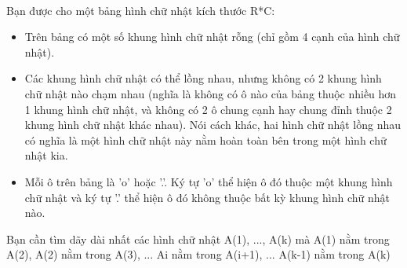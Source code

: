  

Bạn được cho một bảng hình chữ nhật kích thước R*C:
\begin{itemize}
	\item Trên bảng có một số khung hình chữ nhật rỗng (chỉ gồm 4 cạnh của hình chữ nhật).
	\item Các khung hình chữ nhật có thể lồng nhau, nhưng không có 2 khung hình chữ nhật nào chạm nhau (nghĩa là không có ô nào của bảng thuộc nhiều hơn 1 khung hình chữ nhật, và không có 2 ô chung cạnh hay chung đỉnh thuộc 2 khung hình chữ nhật khác nhau). Nói cách khác, hai hình chữ nhật lồng nhau có nghĩa là một hình chữ nhật này nằm hoàn toàn bên trong một hình chữ nhật kia.
	\item Mỗi ô trên bảng là 'o' hoặc '.'. Ký tự 'o' thể hiện ô đó thuộc một khung hình chữ nhật và ký tự '.' thể hiện ô đó không thuộc bất kỳ khung hình chữ nhật nào.
\end{itemize}

Bạn cần tìm dãy dài nhất các hình chữ nhật A(1), ..., A(k) mà A(1) nằm trong A(2), A(2) nằm trong A(3), ... Ai nằm trong A(i+1), ... A(k-1) nằm trong A(k)